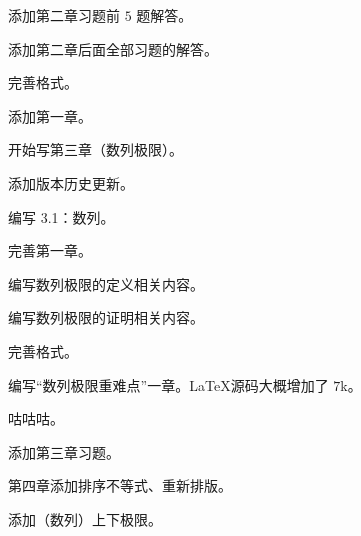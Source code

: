 \documentclass[lang=cn,10pt,twoside]{elegantbook}
\begin{document}
\begin{change}
  \item 添加第二章习题前 $5$ 题解答。
\end{change}

\begin{change}
  \item 添加第二章后面全部习题的解答。
  \item 完善格式。
\end{change}

\begin{change}
  \item 添加第一章。
  \item 开始写第三章（数列极限）。
\end{change}

\begin{change}
  \item 添加版本历史更新。
  \item 编写 3.1：数列。
\end{change}

\begin{change}
  \item 完善第一章。
\end{change}

\begin{change}
  \item 编写数列极限的定义相关内容。
  \item 编写数列极限的证明相关内容。
  \item 完善格式。
\end{change}

\begin{change}
  \item 编写“数列极限重难点”一章。\LaTeX 源码大概增加了 $7$k。
  \item 咕咕咕。
\end{change}

\begin{change}
  \item 添加第三章习题。
  \item 第四章添加排序不等式、重新排版。
\end{change}

\begin{change}
  \item 添加（数列）上下极限。
\end{change}
\end{document}
